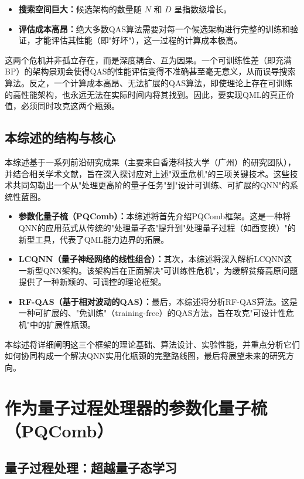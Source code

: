 \documentclass[12pt,a4paper]{article}
\begin{document}
\begin{itemize}
\item \textbf{搜索空间巨大：}候选架构的数量随 $N$ 和 $D$ 呈指数级增长。
\item \textbf{评估成本高昂：}绝大多数QAS算法需要对每一个候选架构进行完整的训练和验证，才能评估其性能（即"好坏"），这一过程的计算成本极高\cite{ref11}。
\end{itemize}

这两个危机并非孤立存在，而是深度耦合、互为因果。一个可训练性差（即充满BP）的架构景观会使得QAS的性能评估变得不准确甚至毫无意义，从而误导搜索算法。反之，一个计算成本高昂、无法扩展的QAS算法，即使理论上存在可训练的高性能架构，也永远无法在实际时间内将其找到。因此，要实现QML的真正价值，必须同时攻克这两个瓶颈。

\subsection{本综述的结构与核心}

本综述基于一系列前沿研究成果（主要来自香港科技大学（广州）的研究团队），并结合相关学术文献，旨在深入探讨应对上述"双重危机"的三项关键技术。这些技术共同勾勒出一个从"处理更高阶的量子任务"到"设计可训练、可扩展的QNN"的系统性蓝图。

\begin{itemize}
\item \textbf{参数化量子梳（PQComb）：}本综述将首先介绍PQComb框架。这是一种将QNN的应用范式从传统的"处理量子态"提升到"处理量子过程（如酉变换）"的新型工具，代表了QML能力边界的拓展。
\item \textbf{LCQNN（量子神经网络的线性组合）：}其次，本综述将深入解析LCQNN这一新型QNN架构。该架构旨在正面解决"可训练性危机"，为缓解贫瘠高原问题提供了一种新颖的、可调控的理论框架\cite{ref14}。
\item \textbf{RF-QAS（基于相对波动的QAS）：}最后，本综述将分析RF-QAS算法。这是一种可扩展的、"免训练"（training-free）的QAS方法，旨在攻克"可设计性危机"中的扩展性瓶颈\cite{ref16}。
\end{itemize}

本综述将详细阐明这三个框架的理论基础、算法设计、实验性能，并重点分析它们如何协同构成一个解决QNN实用化瓶颈的完整路线图，最后将展望未来的研究方向。

\section{作为量子过程处理器的参数化量子梳（PQComb）}

\subsection{量子过程处理：超越量子态学习}
\end{document}
